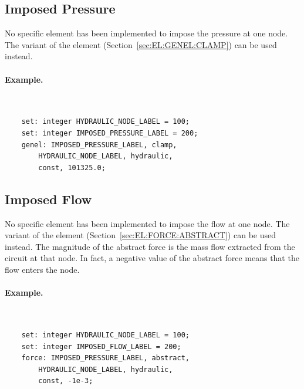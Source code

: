 \subsection{Imposed Pressure}
\label{sec:EL:HYDR:IMPOSED_PRESSURE}
No specific element has been implemented to impose the pressure at one node.
The  variant of the  element
(Section~\ref{sec:EL:GENEL:CLAMP}) can be used instead.

\paragraph{Example.} \
\begin{verbatim}
    set: integer HYDRAULIC_NODE_LABEL = 100;
    set: integer IMPOSED_PRESSURE_LABEL = 200;
    genel: IMPOSED_PRESSURE_LABEL, clamp,
        HYDRAULIC_NODE_LABEL, hydraulic,
        const, 101325.0;
\end{verbatim}


\subsection{Imposed Flow}
\label{sec:EL:HYDR:IMPOSED_FLOW}
No specific element has been implemented to impose the flow at one node.
The \kw{abstract} variant of the \kw{force} element
(Section~\ref{sec:EL:FORCE:ABSTRACT}) can be used instead.
The magnitude of the abstract force is the mass flow extracted
from the circuit at that node.
In fact, a negative value of the abstract force means that the flow enters
the node.

\paragraph{Example.} \
\begin{verbatim}
    set: integer HYDRAULIC_NODE_LABEL = 100;
    set: integer IMPOSED_FLOW_LABEL = 200;
    force: IMPOSED_PRESSURE_LABEL, abstract,
        HYDRAULIC_NODE_LABEL, hydraulic,
        const, -1e-3;
\end{verbatim}





